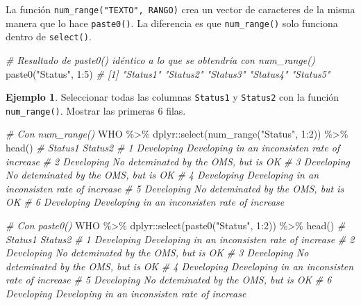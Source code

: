 \documentclass[
]{article}
\newenvironment{Shaded}{\begin{snugshade}}{\end{snugshade}}
\newcommand{\CommentTok}[1]{\textcolor[rgb]{0.56,0.35,0.01}{\textit{#1}}}
\newcommand{\DecValTok}[1]{\textcolor[rgb]{0.00,0.00,0.81}{#1}}
\newcommand{\FunctionTok}[1]{\textcolor[rgb]{0.00,0.00,0.00}{#1}}
\newcommand{\NormalTok}[1]{#1}
\newcommand{\SpecialCharTok}[1]{\textcolor[rgb]{0.00,0.00,0.00}{#1}}
\newcommand{\StringTok}[1]{\textcolor[rgb]{0.31,0.60,0.02}{#1}}
\theoremstyle{definition}
\theoremstyle{definition}
\newtheorem{example}{Ejemplo}[section]
\theoremstyle{definition}
\theoremstyle{definition}
\theoremstyle{remark}
\begin{document}
La función \texttt{num\_range("TEXTO",\ RANGO)} crea un vector de caracteres de la misma manera que lo hace \texttt{paste0()}. La diferencia es que \texttt{num\_range()} solo funciona dentro de \texttt{select()}.

\begin{Shaded}
\begin{Highlighting}[]
\CommentTok{\# Resultado de paste0() idéntico a lo que se obtendría con num\_range()}
\FunctionTok{paste0}\NormalTok{(}\StringTok{"Status"}\NormalTok{, }\DecValTok{1}\SpecialCharTok{:}\DecValTok{5}\NormalTok{)}
\CommentTok{\# [1] "Status1" "Status2" "Status3" "Status4" "Status5"}
\end{Highlighting}
\end{Shaded}

\begin{example}

Seleccionar todas las columnas \texttt{Status1} y \texttt{Status2} con la función \texttt{num\_range()}. Mostrar las primeras 6 filas.

\begin{Shaded}
\begin{Highlighting}[]
\CommentTok{\# Con num\_range()}
\NormalTok{WHO }\SpecialCharTok{\%\textgreater{}\%} 
\NormalTok{  dplyr}\SpecialCharTok{::}\FunctionTok{select}\NormalTok{(}\FunctionTok{num\_range}\NormalTok{(}\StringTok{"Status"}\NormalTok{, }\DecValTok{1}\SpecialCharTok{:}\DecValTok{2}\NormalTok{)) }\SpecialCharTok{\%\textgreater{}\%} 
  \FunctionTok{head}\NormalTok{()}
\CommentTok{\#      Status1                                       Status2}
\CommentTok{\# 1 Developing Developing in an inconsisten rate of increase}
\CommentTok{\# 2 Developing          No deteminated by the OMS, but is OK}
\CommentTok{\# 3 Developing          No deteminated by the OMS, but is OK}
\CommentTok{\# 4 Developing Developing in an inconsisten rate of increase}
\CommentTok{\# 5 Developing          No deteminated by the OMS, but is OK}
\CommentTok{\# 6 Developing Developing in an inconsisten rate of increase}

\CommentTok{\# Con paste0()}
\NormalTok{WHO }\SpecialCharTok{\%\textgreater{}\%} 
\NormalTok{  dplyr}\SpecialCharTok{::}\FunctionTok{select}\NormalTok{(}\FunctionTok{paste0}\NormalTok{(}\StringTok{"Status"}\NormalTok{, }\DecValTok{1}\SpecialCharTok{:}\DecValTok{2}\NormalTok{)) }\SpecialCharTok{\%\textgreater{}\%} 
  \FunctionTok{head}\NormalTok{()}
\CommentTok{\#      Status1                                       Status2}
\CommentTok{\# 1 Developing Developing in an inconsisten rate of increase}
\CommentTok{\# 2 Developing          No deteminated by the OMS, but is OK}
\CommentTok{\# 3 Developing          No deteminated by the OMS, but is OK}
\CommentTok{\# 4 Developing Developing in an inconsisten rate of increase}
\CommentTok{\# 5 Developing          No deteminated by the OMS, but is OK}
\CommentTok{\# 6 Developing Developing in an inconsisten rate of increase}
\end{Highlighting}
\end{Shaded}

\end{example}
\end{document}
